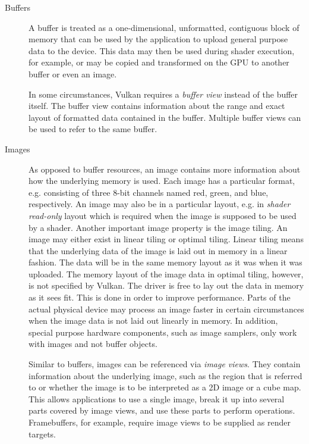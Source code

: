     \begin{description}
      \item[Buffers]
        A buffer is treated as a one-dimensional, unformatted, contiguous block of memory that can be used by the application to upload general purpose data to the device.
        This data may then be used during shader execution, for example, or may be copied and transformed on the GPU to another buffer or even an image.

        In some circumstances, Vulkan requires a \textit{buffer view} instead of the buffer itself.
        The buffer view contains information about the range and exact layout of formatted data contained in the buffer.
        Multiple buffer views can be used to refer to the same buffer.

      \item[Images]
        As opposed to buffer resources, an image contains more information about how the underlying memory is used.
        Each image has a particular format, e.g. consisting of three 8-bit channels named red, green, and blue, respectively.
        An image may also be in a particular layout, e.g. in \textit{shader read-only} layout which is required when the image is supposed to be used by a shader.
        Another important image property is the image tiling.
        An image may either exist in linear tiling or optimal tiling.
        Linear tiling means that the underlying data of the image is laid out in memory in a linear fashion.
        The data will be in the same memory layout as it was when it was uploaded.
        The memory layout of the image data in optimal tiling, however, is not specified by Vulkan.
        The \gls{driver} is free to lay out the data in memory as it sees fit.
        This is done in order to improve performance.
        Parts of the actual physical device may process an image faster in certain circumstances when the image data is not laid out linearly in memory.
        In addition, special purpose hardware components, such as image samplers, only work with images and not buffer objects.

        Similar to buffers, images can be referenced via \textit{image views}.
        They contain information about the underlying image, such as the region that is referred to or whether the image is to be interpreted as a 2D image or a cube map.
        This allows applications to use a single image, break it up into several parts covered by image views, and use these parts to perform operations.
        Framebuffers, for example, require image views to be supplied as render targets.
    \end{description}


